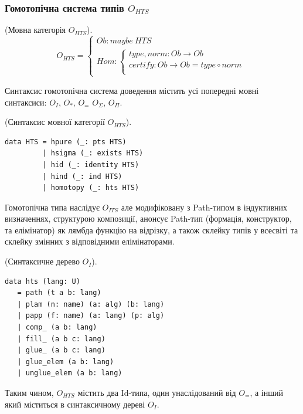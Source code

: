 \begin{definition}
\begin{definition}
\begin{definition}
\begin{definition}
\newpage
\subsubsection{Гомотопічна система типів $O_{HTS}$}

\begin{definition} (Мовна категорія $O_{HTS}$).
$$
O_{HTS} =
\begin{cases}
Ob: maybe\ HTS \\
Hom: \begin{cases}
type,norm: Ob \rightarrow Ob \\
certify: Ob \rightarrow Ob = type \circ norm \\
\end{cases}
\end{cases}
$$
\end{definition}

Синтаксис гомотопічна система доведення містить усі
попередні мовні синтаксиси: $O_I$, $O_*$, $O_=$ $O_\Sigma$, $O_\Pi$.

\begin{definition} (Синтаксис мовної категорії $O_{HTS}$).
\begin{lstlisting}
data HTS = hpure (_: pts HTS)
         | hsigma (_: exists HTS)
         | hid (_: identity HTS)
         | hind (_: ind HTS)
         | homotopy (_: hts HTS)
\end{lstlisting}
\end{definition}

Гомотопічна типа наслідує $O_{ITS}$ але модифіковану з
Path-типом в індуктивних визначеннях, структурою композиції,
анонсує Path-тип (формація, конструктор, та елімінатор)
як лямбда функцію на відрізку, а також склейку типів у всесвіті
та склейку змінних з відповідними елімінаторами.

\begin{definition} (Синтаксичне дерево $O_I$).
\begin{lstlisting}
data hts (lang: U)
   = path (t a b: lang)
   | plam (n: name) (a: alg) (b: lang)
   | papp (f: name) (a: lang) (p: alg)
   | comp_ (a b: lang)
   | fill_ (a b c: lang)
   | glue_ (a b c: lang)
   | glue_elem (a b: lang)
   | unglue_elem (a b: lang)
\end{lstlisting}
\end{definition}

Таким чином,
$O_{HTS}$ містить два Id-типа, один унаслідований від $O_=$,
а інший який міститься в синтаксичному дереві $O_I$.

\\


\end{definition}
\end{definition}
\end{definition}
\end{definition}
